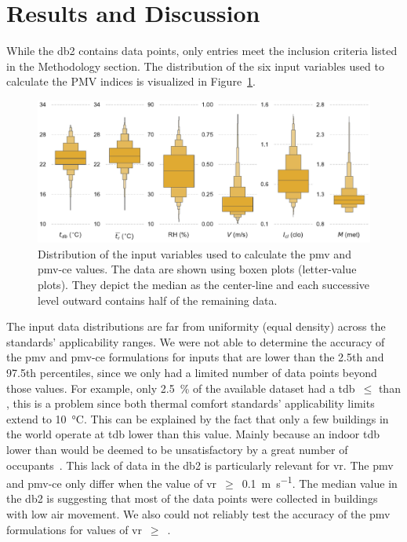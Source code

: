 \section{Results and Discussion}\label{sec:results}
While the \ac{db2} contains  data points, only  entries meet the inclusion criteria listed in the Methodology section.
The distribution of the six input variables used to calculate the PMV indices is visualized in Figure~\ref{fig:dist_input_data}.
\begin{figure}[htb!]
    \centering
    \includegraphics[width=\textwidth]{figures/dist_input_data}
    \caption{Distribution of the input variables used to calculate the \ac{pmv} and \ac{pmv-ce} values.
    The data are shown using boxen plots (letter-value plots).
    They depict the median as the center-line and each successive level outward contains half of the remaining data.}
    \label{fig:dist_input_data}
\end{figure}
The input data distributions are far from uniformity (equal density) across the standards' applicability ranges.
We were not able to determine the accuracy of the \ac{pmv} and \ac{pmv-ce} formulations for inputs that are lower than the 2.5th and 97.5th percentiles, since we only had a limited number of data points beyond those values.
For example, only \qty{2.5}{\percent} of the available dataset had a \ac{tdb}~$\leq$ than , this is a problem since both thermal comfort standards' applicability limits extend to \qty{10}{\celsius}.
This can be explained by the fact that only a few buildings in the world operate at \ac{tdb} lower than this value.
Mainly because an indoor \ac{tdb} lower than  would be deemed to be unsatisfactory by a great number of occupants~\cite{iso7730}.
This lack of data in the \ac{db2} is particularly relevant for \ac{vr}.
The \ac{pmv} and \ac{pmv-ce} only differ when the value of \ac{vr}~$\geq$~\qty{0.1}{\m\per\s}.
The median value in the \ac{db2} is  suggesting that most of the data points were collected in buildings with low air movement.
We also could not reliably test the accuracy of the \ac{pmv} formulations for values of \ac{vr}~$\geq$~.

